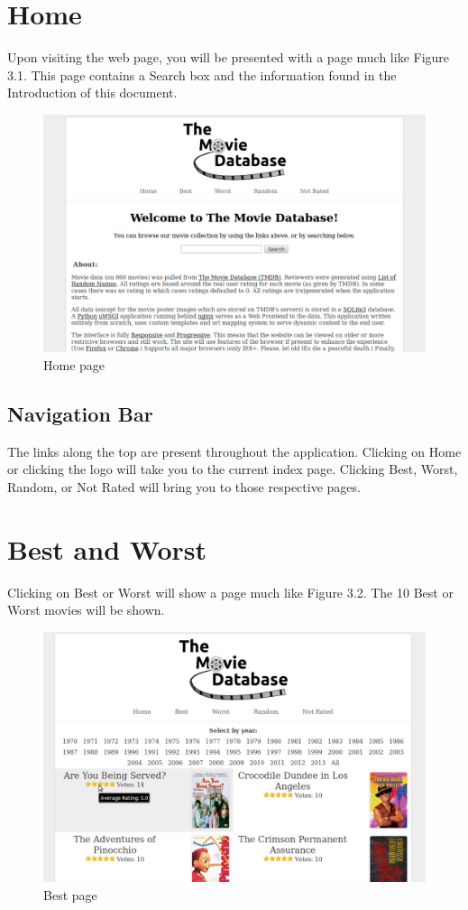 \documentclass[10pt,a4paper]{scrreprt}
\begin{document}
\section{Home}
Upon visiting the web page, you will be presented with a page much like Figure 3.1. This page contains a Search box and the information found in the Introduction of this document.

\begin{figure}[H]
\centering
\includegraphics[scale=.25]{index.png}
\caption{Home page}
\end{figure}

\subsection{Navigation Bar}
The links along the top are present throughout the application. Clicking on Home or clicking the logo will take you to the current index page. Clicking Best, Worst, Random, or Not Rated will bring you to those respective pages.

\section{Best and Worst}
Clicking on Best or Worst will show a page much like Figure 3.2. The 10 Best or Worst movies will be shown.

\begin{figure}[H]
\centering
\includegraphics[scale=.25]{best.png}
\caption{Best page}
\end{figure}
\end{document}
